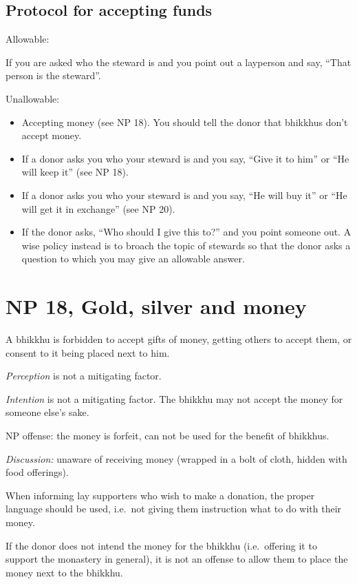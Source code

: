 \subsection{Protocol for accepting funds}

Allowable:

If you are asked who the steward is and you point out a layperson and
say, ``That person is the steward''.

Unallowable:

\begin{itemize}
\tightlist
\item
  Accepting money (see NP 18). You should tell the donor that bhikkhus
  don't accept money.
\item
  If a donor asks you who your steward is and you say, ``Give it to
  him'' or ``He will keep it'' (see NP 18).
\item
  If a donor asks you who your steward is and you say, ``He will buy
  it'' or ``He will get it in exchange'' (see NP 20).
\item
  If the donor asks, ``Who should I give this to?'' and you point
  someone out. A wise policy instead is to broach the topic of stewards
  so that the donor asks a question to which you may give an allowable
  answer.
\end{itemize}

\section{NP 18, Gold, silver and money}

A bhikkhu is forbidden to accept gifts of money, getting others to
accept them, or consent to it being placed next to him.

\emph{Perception} is not a mitigating factor.

\emph{Intention} is not a mitigating factor. The bhikkhu may not accept
the money for someone else's sake.

NP offense: the money is forfeit, can not be used for the benefit of
bhikkhus.

\emph{Discussion:} unaware of receiving money (wrapped in a bolt of
cloth, hidden with food offerings).

When informing lay supporters who wish to make a donation, the proper
language should be used, i.e.~not giving them instruction what to do
with their money.

If the donor does not intend the money for the bhikkhu (i.e.~offering it
to support the monastery in general), it is not an offense to allow them
to place the money next to the bhikkhu.

